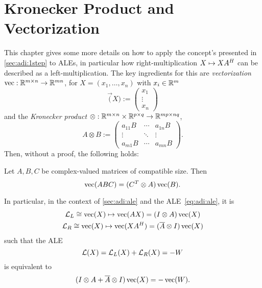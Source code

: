 \chapter{Kronecker Product and Vectorization}
\label{sec:vectorization}

This chapter gives some more details on how to apply the concept's presented in \autoref{sec:adi:1step} to \acp{ALE},
in particular how right-multiplication $X \mapsto XA^H$ can be described as a left-multiplication.
The key ingredients for this are \emph{vectorization} $\operatorname{vec} : \mathbb{R}^{m\times n} \to \mathbb{R}^{mn}$,
\eg for $X=(x_1,\ldots, x_n)$ with $x_i\in\mathbb{R}^m$
\begin{equation}
  \vec(X) := \begin{pmatrix}
    x_1 \\
    \vdots \\
    x_n
  \end{pmatrix}
\end{equation}
and the \emph{Kronecker product} $\otimes : \mathbb{R}^{m\times n} \times \mathbb{R}^{p\times q} \to \mathbb{R}^{mp \times nq}$,
\begin{equation}
  A \otimes B := \begin{pmatrix}
    a_{11} B & \cdots & a_{1n} B \\
    \vdots   & \ddots & \vdots \\
    a_{m1} B & \cdots & a_{mn} B
  \end{pmatrix}
  .
\end{equation}
Then, without a proof, the following holds:

\begin{proposition}
  Let $A, B, C$ be complex-valued matrices of compatible size. Then
  \begin{equation*}
    \operatorname{vec}(ABC) = (C^T \otimes A) \operatorname{vec}(B)
    .
  \end{equation*}
\end{proposition}

In particular, in the context of \autoref{sec:adi:ale}
and the \ac{ALE}~\eqref{eq:adi:ale}, it is
\begin{gather}
  \Lyap_L \cong \vec(X) \mapsto \vec(AX) = (I \otimes A) \vec(X) \\
  \Lyap_R \cong \vec(X) \mapsto \vec(XA^\HT) = (\conj A \otimes I) \vec(X)
\end{gather}
such that the \ac{ALE}
\begin{equation}
  \operatorname{\mathcal L}(X) = \operatorname{\mathcal L}_L(X) + \operatorname{\mathcal L}_R(X) = -W
\end{equation}
is equivalent to
\begin{equation}
  (I \otimes A + \conj A \otimes I) \vec(X) = -\vec(W)
  .
\end{equation}
